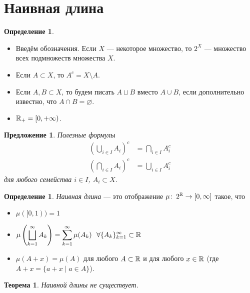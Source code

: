 \documentclass[a4paper,14pt]{extarticle}
\newcounter{theoremCnt}
\theoremstyle{definition}
\newtheorem{df}[theoremCnt]{Определение}
\theoremstyle{plain}
\newtheorem{thm}[theoremCnt]{Теорема}
\theoremstyle{plain}
\theoremstyle{plain}
\theoremstyle{plain}
\newtheorem{prop}[theoremCnt]{Предложение}
\theoremstyle{definition}
\theoremstyle{definition}
\theoremstyle{definition}
\theoremstyle{definition}
\theoremstyle{definition}
\theoremstyle{definition}
\theoremstyle{plain}
\theoremstyle{plain}
\theoremstyle{plain}
\theoremstyle{plain}
\theoremstyle{definition}
\theoremstyle{definition}
\theoremstyle{definition}
\theoremstyle{definition}
\theoremstyle{definition}
\newcommand{\R}{\ensuremath \mathbb{R}}
\begin{document}
\section{Наивная длина}

\begin{df}\
 \begin{itemize}
  \item Введём обозначения. Если $ X $ --- некоторое множество, то $ 2^X $ --- множество всех подмножеств множества $ X $.
  \item Если $ A \subset X $, то $ A^c = X \setminus A $.
  \item Если $ A, B \subset X $, то будем писать $ A \sqcup B $ вместо $ A \cup B $, если дополнительно известно, что $ A \cap B = \varnothing $.
  \item $ \R_+ = [0, +\infty) $.
 \end{itemize}
\end{df}
\begin{prop}
 Полезные формулы
 \begin{align*}
  \left( \bigcup_{i \in I} A_i \right)^c & = \bigcap_{i \in I} A_i^c \\
  \left( \bigcap_{i \in I} A_i \right)^c & = \bigcup_{i \in I} A_i^c
 \end{align*} для любого семейства $ i \in I $, $ A_i \subset X $.
\end{prop}
\begin{df}
 \textit{Наивная длина} --- это отображение $ \mu \colon\, 2^\R \to [0,\infty] $ такое, что
 \begin{itemize}
  \item $ \mu ([0, 1)) = 1 $
  \item $ \displaystyle \mu\left( \bigsqcup_{k=1}^\infty A_k \right) = \sum_{k=1}^\infty \mu( A_k ) \ \ \forall \{A_{k}\}_{k=1}^{\infty} \subset \R $
  \item $ \mu(A + x) = \mu(A) $ для любого $ A \subset \R $ и для любого $ x \in \R $ (где $ A + x = \{ a + x \mid a \in A \} $).
 \end{itemize}
\end{df}
\begin{thm}
 Наивной длины не существует.
\end{thm}
\end{document}
